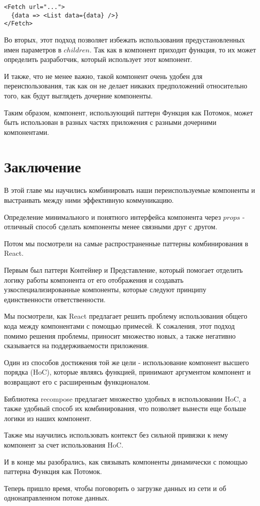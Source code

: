 \begin{lstlisting}
<Fetch url="...">
  {data => <List data={data} />}
</Fetch>
\end{lstlisting}

Во вторых, этот подход позволяет избежать использования предустановленных имен параметров в $children$. Так как в компонент приходит функция, то их может определить разработчик, который использует этот компонент.

И также, что не менее важно, такой компонент очень удобен для переиспользования, так как он не делает никаких предположений относительно того, как будут выглядеть дочерние компоненты.

Таким образом, компонент, использующий паттерн Функция как Потомок, может быть использован в разных частях приложения с разными дочерними компонентами.

\section{Заключение}

В этой главе мы научились комбинировать наши переиспользуемые компоненты и выстраивать между ними эффективную коммуникацию.

Определение минимального и понятного интерфейса компонента через $props$ - отличный способ сделать компоненты менее связными друг с другом.

Потом мы посмотрели на самые распространенные паттерны комбинирования в React.

Первым был паттерн Контейнер и Представление, который помогает отделить логику работы компонента от его отображения и создавать узкоспециализированные компоненты, которые следуют принципу единственности ответственности.

Мы посмотрели, как React предлагает решить проблему использования общего кода между компонентами с помощью примесей. К сожаления, этот подход помимо решения проблемы, приносит множество новых, а также негативно сказывается на поддерживаемости приложения.

Один из способов достижения той же цели - использование компонент высшего порядка (HoC), которые являясь функцией, принимают аргументом компонент и возвращают его с расширенным функционалом.

Библиотека recompose предлагает множество удобных в использовании HoC, а также удобный способ их комбинирования, что позволяет вынести еще больше логики из наших компонент.

Также мы научились использовать контекст без сильной привязки к нему компонент за счет использования HoC.

И в конце мы разобрались, как связывать компоненты динамически с помощью паттерна Функция как Потомок.

Теперь пришло время, чтобы поговорить о загрузке данных из сети и об однонаправленном потоке данных. 

















